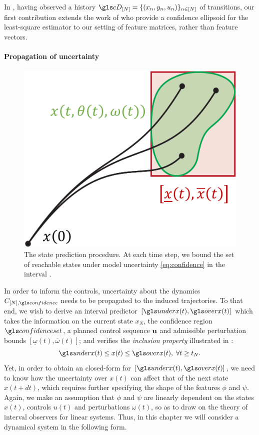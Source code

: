 In \textbf{}, having observed a history $\cD_{[N]} = \{(x_n, y_n,u_n)\}_{n\in[N]}$ of transitions, our first contribution extends the work of \citet{Abbasi2011} who provide a confidence ellipsoid for the least-square estimator to our setting of feature matrices, rather than feature vectors.

\paragraph{Propagation of uncertainty}

\begin{figure}[ht]
	\centering
	\includegraphics[trim={0 0 0 0}, clip, width=0.5\linewidth]{img/interval-hull}
	\caption{The state prediction procedure. At each time step, we bound the set of reachable states  under model uncertainty \eqref{eq:confidence} in the interval .}
	\label{fig:prediction}
\end{figure}

In order to inform the controls, uncertainty about the dynamics $C_{[N],\confidence}$ needs to be propagated to the induced trajectories. To that end, we wish to derive an interval predictor $[\ux(t),\ox(t)]$ which takes the information on the current state ${x}_N$, the confidence region $\confidenceset$, a planned control sequence $\mathbf{u}$ and admissible perturbation bounds $[\underline{\omega}(t),\overline{\omega}(t)]$; and verifies the \emph{inclusion property} illustrated in :
\begin{equation}
\label{eq:inclusion-property}
\ux(t)\leq x(t)\leq \ox(t),\; \forall t\geq t_N.
\end{equation}
Yet, in order to obtain an closed-form for $[\ux(t),\ox(t)]$, we need to know how the uncertainty over $x(t)$ can affect that of the next state $x(t+dt)$, which requires further specifying the shape of the features $\phi$ and $\psi$. Again, we make an assumption that $\phi$ and $\psi$ are linearly dependent on the states $x(t)$, controls $u(t)$ and perturbations $\omega(t)$, so as to draw on the theory of interval observers for linear systems. Thus, in this chapter we will consider a dynamical system in the following form.

